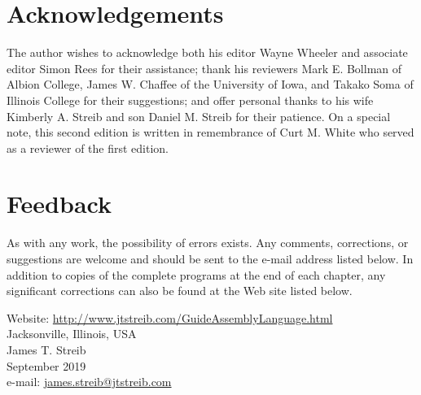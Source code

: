\documentclass[10pt]{book}
\begin{document}
\section*{Acknowledgements}
The author wishes to acknowledge both his editor Wayne Wheeler and associate editor Simon Rees for their assistance; thank his reviewers Mark E. Bollman of Albion College, James W. Chaffee of the University of Iowa, and Takako Soma of Illinois College for their suggestions; and offer personal thanks to his wife Kimberly A. Streib and son Daniel M. Streib for their patience. On a special note, this second edition is written in remembrance of Curt M. White who served as a reviewer of the first edition.

\section*{Feedback}
As with any work, the possibility of errors exists. Any comments, corrections, or suggestions are welcome and should be sent to the e-mail address listed below. In addition to copies of the complete programs at the end of each chapter, any significant corrections can also be found at the Web site listed below.


Website: \href{http://www.jtstreib.com/GuideAssemblyLanguage.html}{http://www.jtstreib.com/GuideAssemblyLanguage.html}\\
Jacksonville, Illinois, USA\\
James T. Streib\\
September 2019\\
e-mail: \href{mailto:james.streib@jtstreib.com}{james.streib@jtstreib.com}
\end{document}
